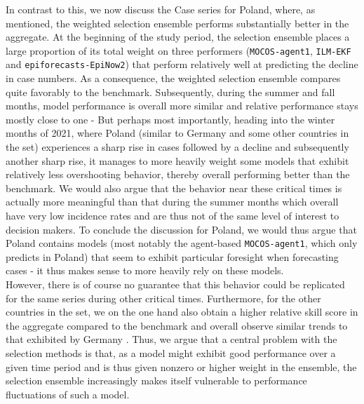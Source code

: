 In contrast to this, we now discuss the Case series for Poland, where, as mentioned, the weighted selection ensemble performs substantially better in the aggregate. At the beginning of the study period, the selection ensemble places a large proportion of its total weight on three performers (\texttt{MOCOS-agent1}, \texttt{ILM-EKF} and \texttt{epiforecasts-EpiNow2}) that perform relatively well at predicting the decline in case numbers. As a consequence, the weighted selection ensemble compares quite favorably to the benchmark. Subsequently, during the summer and fall months, model performance is overall more similar and relative performance stays mostly close to one - %
But perhaps most importantly, heading into the winter months of 2021, where Poland (similar to Germany and some other countries in the set) experiences a sharp rise in cases followed by a decline and subsequently another sharp rise, it manages to more heavily weight some models that exhibit relatively less overshooting behavior, thereby overall performing better than the benchmark. We would also argue that the behavior near these critical times is actually more meaningful than that during the summer months which overall have very low incidence rates and are thus not of the same level of interest to decision makers. To conclude the discussion for Poland, we would thus argue that Poland contains models (most notably the agent-based \texttt{MOCOS-agent1}, which only predicts in Poland) that seem to exhibit particular foresight when forecasting cases - it thus makes sense to more heavily rely on these models. \\%
However, there is of course no guarantee that this behavior could be replicated for the same series during other critical times. Furthermore, for the other countries in the set, we on the one hand also obtain a higher relative skill score in the aggregate compared to the benchmark and overall observe similar trends to that exhibited by Germany . Thus, we argue that a central problem with the selection methods is that, as a model might exhibit good performance over a given time period and is thus given nonzero or higher weight in the ensemble, the selection ensemble increasingly makes itself vulnerable to performance fluctuations of such a model.\\ 
